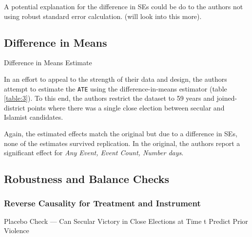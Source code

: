 \documentclass{scrartcl}
\begin{document}
A potential explanation for the difference in SEs could be do to the authors not using robust standard error calculation. (will look into this more).


\subsection{Difference in Means}

\begin{table}[ht]
  \begin{center}
    \scalebox{0.75}{
      
    }
    \caption{Difference in Means Estimate}
    \label{table:3}
  \end{center}
\end{table}

In an effort to appeal to the strength of their data and design, the authors attempt to estimate the \texttt{ATE} using the difference-in-means estimator (table \ref{table:3}).
To this end, the authors restrict the dataset to 59 years and joined-district points where there was a single close election between secular and Islamist candidates.

Again, the estimated effects match the original but due to a difference in SEs, none of the estimates survived replication. In the original, the authors report a significant effect for \textit{Any Event, Event Count, Number days}.

\subsection{Robustness and Balance Checks}

\subsubsection{Reverse Causality for Treatment and Instrument}

\begin{table}[ht]
  \begin{center}
    \scalebox{0.75}{
      
    }
    \caption{Placebo Check — Can Secular Victory in Close Elections at Time t Predict Prior Violence}
    \label{table:1}
  \end{center}
\end{table}
\end{document}
